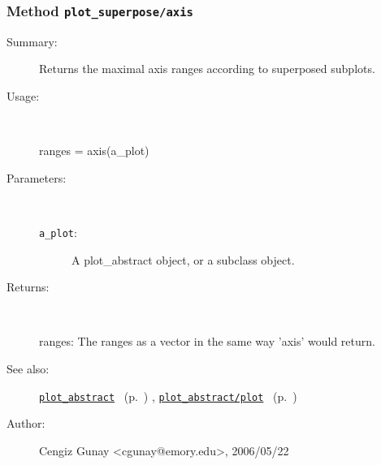 \subsubsection[Method \texttt{axis}]{Method \texttt{plot\_superpose/axis}}%
%
\label{ref_plot_superpose__axis}%
\hypertarget{ref_plot_superpose__axis}{}%
\begin{description}
\item[Summary:]Returns the maximal axis ranges according to superposed subplots.
%
\item[Usage:]~%
\begin{lyxcode}%
ranges = axis(a\_plot)
%
\end{lyxcode}%
%
%
\item[Parameters:]~
\begin{description}%
\item[\texttt{a\_plot}:]
 A plot\_abstract object, or a subclass object.
\end{description}%
%
\item[Returns:]~

	ranges: The ranges as a vector in the same way 'axis' would return.
%
%
\item[See also:]%
\hyperlink{ref_plot_abstract}{\texttt{plot\_abstract}}%
\ (p.~\pageref{ref_plot_abstract})%
%
, \hyperlink{ref_plot_abstract__plot}{\texttt{plot\_abstract/plot}}%
\ (p.~\pageref{ref_plot_abstract__plot})%
%
%
\item[Author:]%
Cengiz Gunay <cgunay@emory.edu>, 2006/05/22%
\end{description}
\methodline%
